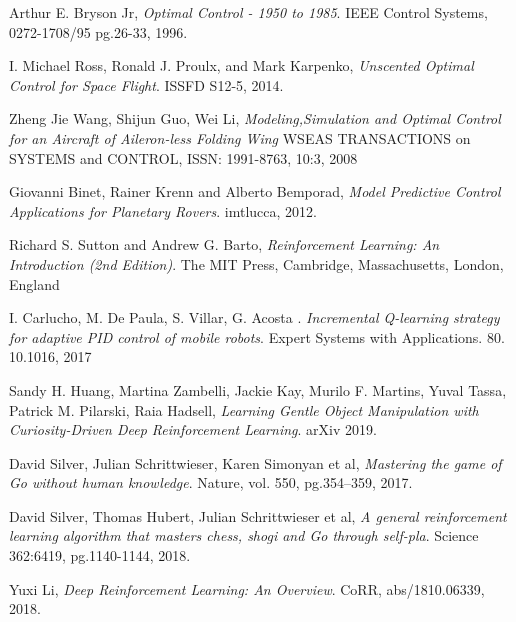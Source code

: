 \documentclass[12pt]{report}
\begin{document}
\renewcommand{\bibname}{References}
\begin{thebibliography}{9}
        Arthur E. Bryson Jr,
        \emph{Optimal Control - 1950 to 1985}.
        IEEE Control Systems, 0272-1708/95 pg.26-33, 1996.

        I. Michael Ross, Ronald J. Proulx, and Mark Karpenko,
        \emph{Unscented Optimal Control for Space Flight}.
        ISSFD S12-5, 2014.

        Zheng Jie Wang, Shijun Guo, Wei Li,
        \emph{Modeling,Simulation and Optimal Control for an Aircraft of
        Aileron-less Folding Wing}
        WSEAS TRANSACTIONS on SYSTEMS and CONTROL, ISSN: 1991-8763, 10:3, 2008

        Giovanni Binet, Rainer Krenn and Alberto Bemporad,
        \emph{Model Predictive Control Applications for Planetary Rovers}.
        imtlucca, 2012.

        Richard S. Sutton and Andrew G. Barto,
        \emph{Reinforcement Learning: An Introduction (2nd Edition)}.
        The MIT Press, Cambridge, Massachusetts, London, England

        I. Carlucho, M. De Paula, S. Villar, G. Acosta . \emph{Incremental Q-learning strategy for adaptive PID control of mobile robots}. 
        Expert Systems with Applications. 80. 10.1016, 2017
    
    Sandy H. Huang, Martina Zambelli, Jackie Kay, Murilo F. Martins, Yuval Tassa, Patrick M. Pilarski, Raia Hadsell, 
    \emph{Learning Gentle Object Manipulation with Curiosity-Driven Deep Reinforcement Learning}.
    arXiv 2019.

        David Silver, Julian Schrittwieser, Karen Simonyan et al,
        \emph{Mastering the game of Go without human knowledge}.
        Nature, vol. 550, pg.354–359, 2017.
    
        David Silver, Thomas Hubert, Julian Schrittwieser et al, 
        \emph{A general reinforcement learning algorithm that
        masters chess, shogi and Go through self-pla}.
        Science 362:6419, pg.1140-1144, 2018.
    
        Yuxi Li, 
        \emph{Deep Reinforcement Learning: An Overview}. 
        CoRR, abs/1810.06339, 2018.
    
\end{thebibliography}
\end{document}
